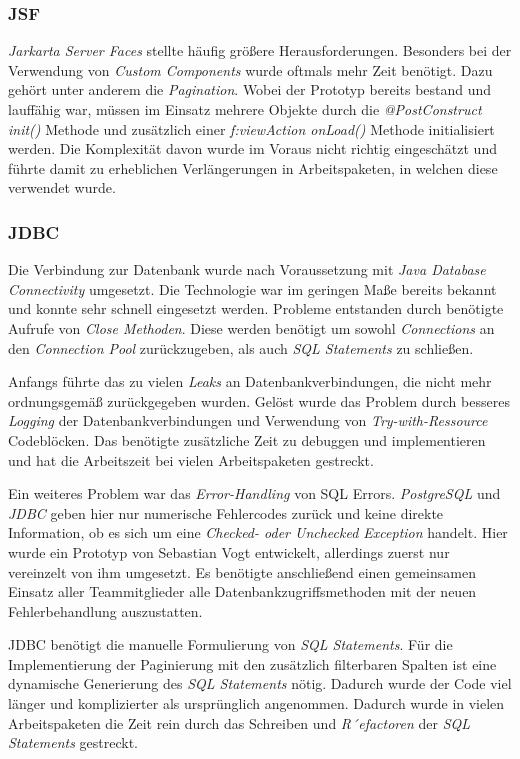 \subsubsection{JSF}

\emph{Jarkarta Server Faces} stellte häufig größere Herausforderungen. Besonders bei der Verwendung von \emph{Custom Components} wurde oftmals mehr Zeit benötigt. Dazu gehört unter anderem die \emph{Pagination}. Wobei der Prototyp bereits bestand und lauffähig war, müssen im Einsatz mehrere Objekte durch die \emph{@PostConstruct init()} Methode und zusätzlich einer \emph{f:viewAction onLoad()} Methode initialisiert werden.
Die Komplexität davon wurde im Voraus nicht richtig eingeschätzt und führte damit zu erheblichen Verlängerungen in Arbeitspaketen, in welchen diese verwendet wurde.

\subsubsection{JDBC}

Die Verbindung zur Datenbank wurde nach Voraussetzung mit \emph{Java Database Connectivity} umgesetzt. Die Technologie war im geringen Maße bereits bekannt und konnte sehr schnell eingesetzt werden. Probleme entstanden durch benötigte Aufrufe von \emph{Close Methoden}. Diese werden benötigt um sowohl \emph{Connections} an den \emph{Connection Pool} zurückzugeben, als auch \emph{SQL Statements} zu schließen.

Anfangs führte das zu vielen \emph{Leaks} an Datenbankverbindungen, die nicht mehr ordnungsgemäß zurückgegeben wurden. Gelöst wurde das Problem durch besseres \emph{Logging} der Datenbankverbindungen und Verwendung von \emph{Try-with-Ressource} Codeblöcken. Das benötigte zusätzliche Zeit zu debuggen und implementieren und hat die Arbeitszeit bei vielen Arbeitspaketen gestreckt.\newline

Ein weiteres Problem war das \emph{Error-Handling} von SQL Errors. \emph{PostgreSQL} und \emph{JDBC} geben hier nur numerische Fehlercodes zurück und keine direkte Information, ob es sich um eine \emph{Checked- oder Unchecked Exception} handelt. Hier wurde ein Prototyp von Sebastian Vogt entwickelt, allerdings zuerst nur vereinzelt von ihm umgesetzt. Es benötigte anschließend einen gemeinsamen Einsatz aller Teammitglieder alle Datenbankzugriffsmethoden mit der neuen Fehlerbehandlung auszustatten. \newline

JDBC benötigt die manuelle Formulierung von \emph{SQL Statements}. Für die Implementierung der Paginierung mit den zusätzlich filterbaren Spalten ist eine dynamische Generierung des \emph{SQL Statements} nötig. Dadurch wurde der Code viel länger und komplizierter als ursprünglich angenommen. Dadurch wurde in vielen Arbeitspaketen die Zeit rein durch das Schreiben und \emph{R´efactoren} der \emph{SQL Statements} gestreckt.

